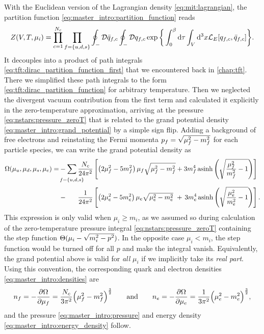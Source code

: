 With the Euclidean version of the Lagrangian density \eqref{eq:mit:lagrangian},
the partition function \eqref{eq:master_intro:partition_function} reads
\begin{equation}
	Z(V, T, \mu_i) = \prod_{c=1}^{N_c} \prod_{f=\{u,d,s\}} \oint_- \mathcal{D} \bar{q}_{f,c} \oint_- \mathcal{D} q_{f,c} \exp \bigg\{ \int_0^\beta \mathop{}\!\mathrm{d} \tau \int_V \mathop{}\!\mathrm{d}^3 x \mathcal{L}_E [q_{f,c},\bar{q}_{f,c}] \bigg\} .
\end{equation}
It decouples into a product of path integrals \eqref{eq:tft:dirac_partition_function_first} that we encountered back in \cref{chap:tft}.
There we simplified these path integrals to the form \eqref{eq:tft:dirac_partition_function} for arbitrary temperature.
Then we neglected the divergent vacuum contribution from the first term and calculated it explicitly in the zero-temperature approximation,
arriving at the pressure \eqref{eq:nstars:pressure_zeroT} that is related to the grand potential density \eqref{eq:master_intro:grand_potential} by a simple sign flip.
Adding a background of free electrons and reinstating the Fermi momenta $p_f = \sqrt{\smash[b]{\mu_f^2-m_f^2}}$ for each particle species,
we can write the grand potential density as
\begin{equation}
\begin{split}
	\Omega(\mu_u,\mu_d,\mu_s,\mu_e) = &-\smashoperator{\sum_{\vphantom{\big|} f=\{u,d,s\}}} \frac{N_c}{24 \pi^2} \left[ \left( 2 \mu_f^2 - 5 m_f^2 \right) \mu_f \sqrt{\mu_f^2 - m_f^2} + 3 m_f^4 \asinh \left( \sqrt{\frac{\mu_{\smash{f}}^2}{m_f^2}-1} \right) \right] \\
	                                  &-\phantom{\sum} \, \frac{1}{24 \pi^2} \left[ \left( 2 \mu_e^2 - 5 m_e^2 \right) \mu_e \sqrt{\mu_e^2 - m_e^2} \, \, + \, 3 m_e^4 \asinh \left( \sqrt{\frac{\mu_{\smash{e}}^2}{m_e^2}-1} \right) \right].
\label{eq:mit:grand_potential}
\end{split}
\end{equation}
This expression is only valid when $\mu_i \geq m_i$,
as we assumed so during calculation of the zero-temperature pressure integral \eqref{eq:nstars:pressure_zeroT} containing the step function $\Theta(\mu_i-\sqrt{\smash[b]{m_i^2-p^2}})$.
In the opposite case $\mu_i < m_i$, the step function would be turned off for all $p$ and make the integral vanish.
Equivalently, the grand potential above is valid for \emph{all} $\mu_i$ if we implicitly take its \emph{real part}.
Using this convention, the corresponding quark and electron densities \eqref{eq:master_intro:densities} are
\begin{equation}
	n_f = -\pdv{\Omega}{\mu_f} = \frac{N_c}{3 \pi^2} \Big( \mu_f^2 - m_f^2 \Big)^{\frac32}
	\qquad \text{and} \qquad
	n_e = -\pdv{\Omega}{\mu_e} = \frac{  1}{3 \pi^2} \Big( \mu_e^2 - m_e^2 \Big)^{\frac32},
\label{eq:mit:particle_densities}%
\end{equation}
and the pressure \eqref{eq:master_intro:pressure} and energy density \eqref{eq:master_intro:energy_density} follow.

